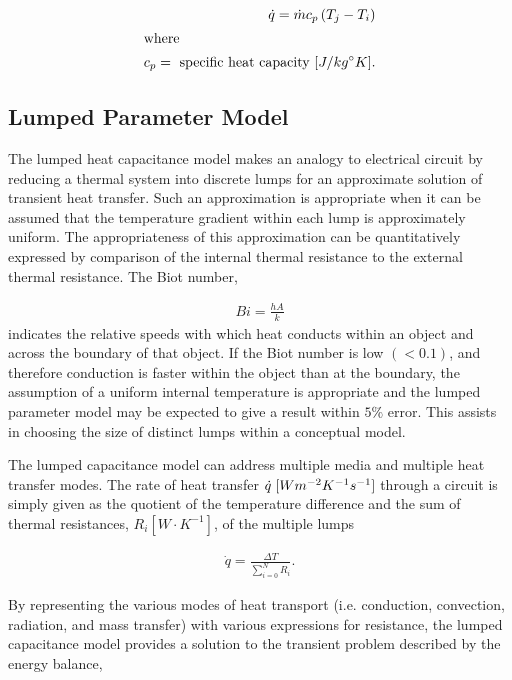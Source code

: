 \begin{align}
  \dot{q} = \dot{m}c_p\left( T_j - T_i \right)\\
  \intertext{where}
  c_p = \mbox{ specific heat capacity } [J/kg^{\circ}K].\nonumber
\end{align}

\subsection{Lumped Parameter Model}
\label{sec:lumpedparam}

The lumped heat capacitance model makes an analogy to electrical circuit by 
reducing a thermal system into discrete lumps for an approximate solution of 
transient heat transfer. Such an approximation is 
appropriate when it can be assumed that the temperature gradient within each 
lump is approximately uniform. The appropriateness of this approximation can be
quantitatively expressed by comparison of the internal thermal resistance to the 
external thermal resistance. The Biot number, 

\begin{align}
  Bi = \frac{hA}{k}
  \label{biot}
\end{align}
indicates the relative speeds with which heat conducts within an object and 
across the boundary of that object. If the Biot number is low $(<0.1)$, and 
therefore conduction is faster within the object than at the boundary, the 
assumption of a uniform internal temperature is appropriate and the lumped 
parameter model may be expected to give a result within $5\%$ 
error\cite{incropera_fundamentals_2006}. This assists in choosing the size of 
distinct lumps within a conceptual model. 

The lumped capacitance model can address multiple media and multiple heat
transfer modes. The rate of heat transfer $\dot{q}\hspace{1mm}[Wm^{-2}K^{-1}s^{-1}]$ 
through a circuit is simply given as the quotient of the temperature 
difference and the sum of thermal resistances, $R_i [W\cdot K^{-1}]$,
of the multiple lumps 

\begin{align}
  \dot{q} = \frac{\Delta T}{\sum _{i=0}^{N}R_i}.
\end{align}

By representing the various modes of heat transport (i.e. conduction, 
convection, radiation, and mass transfer) with various expressions for 
resistance, the lumped capacitance model provides a solution to the transient 
problem described by the energy balance,

